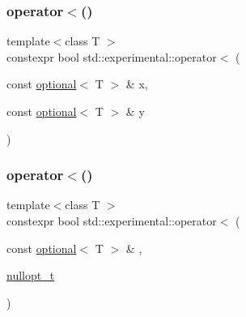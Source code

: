 \subsubsection{\texorpdfstring{operator$<$()}{operator<()}\hspace{0.1cm}{\footnotesize\ttfamily [1/9]}}
{\footnotesize\ttfamily template$<$class T $>$ \\
constexpr bool std\+::experimental\+::operator$<$ (\begin{DoxyParamCaption}\item[{const \mbox{\hyperlink{classstd_1_1experimental_1_1optional}{optional}}$<$ T $>$ \&}]{x,  }\item[{const \mbox{\hyperlink{classstd_1_1experimental_1_1optional}{optional}}$<$ T $>$ \&}]{y }\end{DoxyParamCaption})}

\mbox{\label{namespacestd_1_1experimental_aa7075b9ff2db35978c50e744de295b37}} 
\subsubsection{\texorpdfstring{operator$<$()}{operator<()}\hspace{0.1cm}{\footnotesize\ttfamily [2/9]}}
{\footnotesize\ttfamily template$<$class T $>$ \\
constexpr bool std\+::experimental\+::operator$<$ (\begin{DoxyParamCaption}\item[{const \mbox{\hyperlink{classstd_1_1experimental_1_1optional}{optional}}$<$ T $>$ \&}]{,  }\item[{\mbox{\hyperlink{structstd_1_1experimental_1_1nullopt__t}{nullopt\+\_\+t}}}]{ }\end{DoxyParamCaption})\hspace{0.3cm}{\ttfamily [noexcept]}}

\mbox{\label{namespacestd_1_1experimental_a419ed2da725cc9c030f5d741a1f13d50}} 
